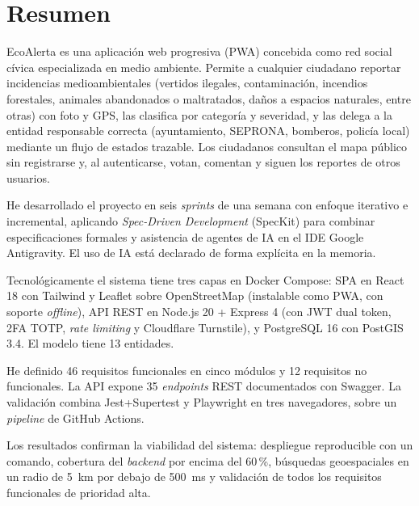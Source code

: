 
\chapter*{Resumen}

EcoAlerta es una aplicación web progresiva (PWA) concebida como red social cívica especializada en medio ambiente. Permite a cualquier ciudadano reportar incidencias medioambientales (vertidos ilegales, contaminación, incendios forestales, animales abandonados o maltratados, daños a espacios naturales, entre otras) con foto y GPS, las clasifica por categoría y severidad, y las delega a la entidad responsable correcta (ayuntamiento, SEPRONA, bomberos, policía local) mediante un flujo de estados trazable. Los ciudadanos consultan el mapa público sin registrarse y, al autenticarse, votan, comentan y siguen los reportes de otros usuarios.

He desarrollado el proyecto en seis \textit{sprints} de una semana con enfoque iterativo e incremental, aplicando \textit{Spec-Driven Development} (SpecKit) para combinar especificaciones formales y asistencia de agentes de IA en el IDE Google Antigravity. El uso de IA está declarado de forma explícita en la memoria.

Tecnológicamente el sistema tiene tres capas en Docker Compose: SPA en React 18 con Tailwind y Leaflet sobre OpenStreetMap (instalable como PWA, con soporte \textit{offline}), API REST en Node.js 20 + Express 4 (con JWT dual token, 2FA TOTP, \textit{rate limiting} y Cloudflare Turnstile), y PostgreSQL 16 con PostGIS 3.4. El modelo tiene 13 entidades.

He definido 46 requisitos funcionales en cinco módulos y 12 requisitos no funcionales. La API expone 35 \textit{endpoints} REST documentados con Swagger. La validación combina Jest+Supertest y Playwright en tres navegadores, sobre un \textit{pipeline} de GitHub Actions.

Los resultados confirman la viabilidad del sistema: despliegue reproducible con un comando, cobertura del \textit{backend} por encima del 60\,\%, búsquedas geoespaciales en un radio de 5~km por debajo de 500~ms y validación de todos los requisitos funcionales de prioridad alta.


